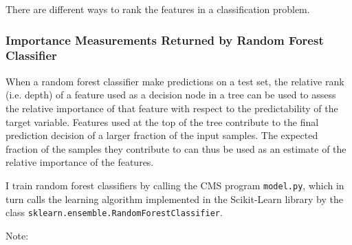 \documentclass[final, 12pt]{elsarticle}
\begin{document}
There are different ways to rank the features in a classification problem.

\subsubsection{Importance Measurements Returned by Random Forest Classifier}

When a random forest classifier make predictions on a test set,
the relative rank (i.e. depth) of a feature used as a decision node in a tree can be used to assess the relative importance of that feature with respect to the predictability of the target variable. Features used at the top of the tree contribute to the final prediction decision of a larger fraction of the input samples. The expected fraction of the samples they contribute to can thus be used as an estimate of the relative importance of the features. \cite{web:slguide}

I train random forest classifiers by calling the CMS program \verb|model.py|, which in turn calls the learning algorithm implemented in the Scikit-Learn library by the class \verb|sklearn.ensemble.RandomForestClassifier|.

Note:
\end{document}
